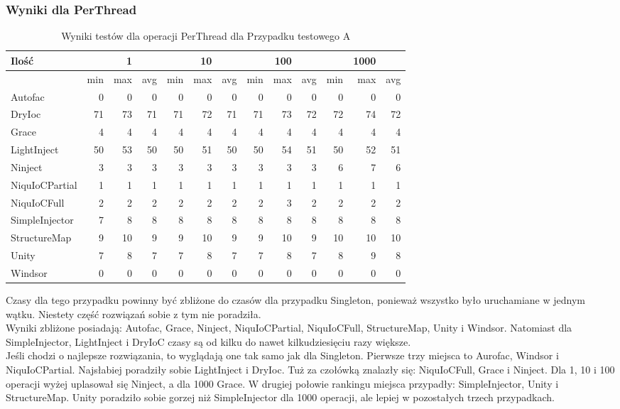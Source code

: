 \documentclass[12pt]{article}
\begin{document}
\subsubsection{Wyniki dla PerThread}
\begin{table}[H]
\captionsetup{belowskip=0pt,aboveskip=0pt}
\begin{center}
\begin{small}
	\begin{tabular}{ | l | r r r | r r r | r r r | r r r | }
    		\hline
Ilość & & 1 & & & 10 & & & 100 & & & 1000 & \\ \hline
 & min & max & avg & min & max & avg & min & max & avg & min & max & avg \\ \hline
Autofac & 0 & 0 & 0 & 0 & 0 & 0 & 0 & 0 & 0 & 0 & 0 & 0 \\ \hline
DryIoc & 71 & 73 & 71 & 71 & 72 & 71 & 71 & 73 & 72 & 72 & 74 & 72 \\ \hline
Grace & 4 & 4 & 4 & 4 & 4 & 4 & 4 & 4 & 4 & 4 & 4 & 4 \\ \hline
LightInject & 50 & 53 & 50 & 50 & 51 & 50 & 50 & 54 & 51 & 50 & 52 & 51 \\ \hline
Ninject & 3 & 3 & 3 & 3 & 3 & 3 & 3 & 3 & 3 & 6 & 7 & 6 \\ \hline
NiquIoCPartial & 1 & 1 & 1 & 1 & 1 & 1 & 1 & 1 & 1 & 1 & 1 & 1 \\ \hline
NiquIoCFull & 2 & 2 & 2 & 2 & 2 & 2 & 2 & 3 & 2 & 2 & 2 & 2 \\ \hline
SimpleInjector & 7 & 8 & 8 & 8 & 8 & 8 & 8 & 8 & 8 & 8 & 8 & 8 \\ \hline
StructureMap & 9 & 10 & 9 & 9 & 10 & 9 & 9 & 10 & 9 & 10 & 10 & 10 \\ \hline
Unity & 7 & 8 & 7 & 7 & 8 & 7 & 7 & 8 & 7 & 8 & 9 & 8 \\ \hline
Windsor & 0 & 0 & 0 & 0 & 0 & 0 & 0 & 0 & 0 & 0 & 0 & 0 \\ \hline
  	\end{tabular}
\end{small}
\end{center}
\caption{Wyniki testów dla operacji PerThread dla Przypadku testowego A}
\label{TestCaseA_PerThread}
\end{table}
Czasy dla tego przypadku powinny być zbliżone do czasów dla przypadku Singleton, ponieważ wszystko było uruchamiane w jednym wątku. Niestety część rozwiązań sobie z tym nie poradziła.\\
Wyniki zbliżone posiadają: Autofac, Grace, Ninject, NiquIoCPartial, NiquIoCFull, StructureMap, Unity i Windsor. Natomiast dla SimpleInjector, LightInject i DryIoC czasy są od kilku do nawet kilkudziesięciu razy większe.\\
Jeśli chodzi o najlepsze rozwiązania, to wyglądają one tak samo jak dla Singleton. Pierwsze trzy miejsca to Aurofac, Windsor i NiquIoCPartial. Najsłabiej poradziły sobie LightInject i DryIoc. Tuż za czołówką znalazły się: NiquIoCFull, Grace i Ninject. Dla 1, 10 i 100 operacji wyżej uplasował się Ninject, a dla 1000 Grace. W drugiej połowie rankingu miejsca przypadły: SimpleInjector, Unity i StructureMap. Unity poradziło sobie gorzej niż SimpleInjector dla 1000 operacji, ale lepiej w pozostałych trzech przypadkach.
\end{document}
